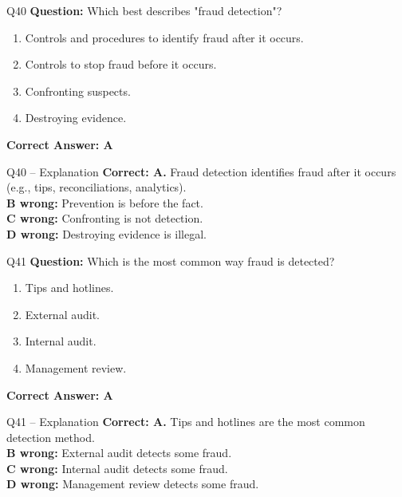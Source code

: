 \documentclass[aspectratio=169,10pt]{beamer}
\begin{document}
	\begin{frame}[t]{Q40}
		\small
		\textbf{Question:} Which best describes "fraud detection"?
		\begin{enumerate}[label=\Alph*.,itemsep=1pt,topsep=2pt]
			\item Controls and procedures to identify fraud after it occurs.
			\item Controls to stop fraud before it occurs.
			\item Confronting suspects.
			\item Destroying evidence.
		\end{enumerate}
		\vspace{4pt}
		\textbf{Correct Answer: A}
	\end{frame}
	
	\begin{frame}[t]{Q40 -- Explanation}
		\small
		\textbf{Correct: A.} Fraud detection identifies fraud after it occurs (e.g., tips, reconciliations, analytics). \\[4pt]
		\textbf{B wrong:} Prevention is before the fact. \\[2pt]
		\textbf{C wrong:} Confronting is not detection. \\[2pt]
		\textbf{D wrong:} Destroying evidence is illegal.
	\end{frame}
	
	\begin{frame}[t]{Q41}
		\small
		\textbf{Question:} Which is the most common way fraud is detected?
		\begin{enumerate}[label=\Alph*.,itemsep=1pt,topsep=2pt]
			\item Tips and hotlines.
			\item External audit.
			\item Internal audit.
			\item Management review.
		\end{enumerate}
		\vspace{4pt}
		\textbf{Correct Answer: A}
	\end{frame}
	
	\begin{frame}[t]{Q41 -- Explanation}
		\small
		\textbf{Correct: A.} Tips and hotlines are the most common detection method. \\[4pt]
		\textbf{B wrong:} External audit detects some fraud. \\[2pt]
		\textbf{C wrong:} Internal audit detects some fraud. \\[2pt]
		\textbf{D wrong:} Management review detects some fraud.
	\end{frame}
	
\end{document}
